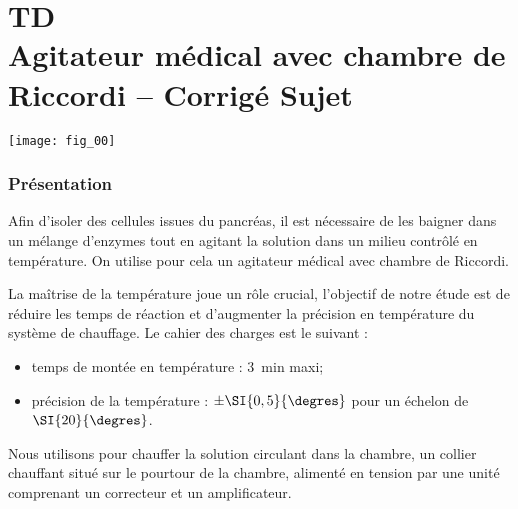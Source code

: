 \chapter*{TD  \\ 
Agitateur médical avec chambre de Riccordi -- 
\ifprof Corrigé \else Sujet \fi}

\iflivret {} \else
\ifprof  {} \else \fi
\fi

\setcounter{question}{0}

\begin{marginfigure} [4cm]
\centering
\texttt{[image: fig\_00]}
\end{marginfigure}



\subsection*{Présentation}


Afin d'isoler des cellules issues du pancréas, il est nécessaire de les baigner dans un mélange d'enzymes tout en agitant la solution dans un milieu contrôlé en température. On utilise pour cela 
un agitateur médical avec chambre de Riccordi.


\begin{obj}
La maîtrise de la température joue un rôle crucial, l’objectif de notre étude est de réduire les temps
de réaction et d’augmenter la précision en température du système de chauffage. Le cahier des charges est le suivant : 
\begin{itemize}
\item temps de montée en température : \SI{3}{min} maxi;
\item précision de la température : $\pm \SI{0,5}{\degres}$ pour un échelon de $\SI{20}{\degres}$.
\end{itemize}
\end{obj}
Nous utilisons pour chauffer la solution circulant dans la chambre, un collier chauffant situé sur le
pourtour de la chambre, alimenté en tension par une unité comprenant un correcteur et un
amplificateur.


